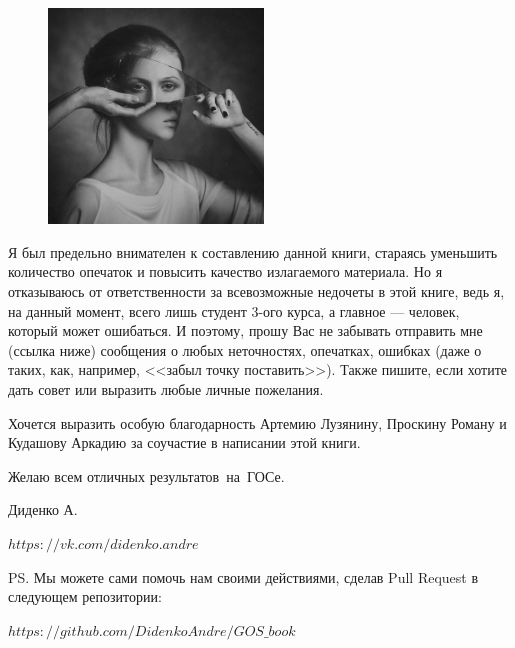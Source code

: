 \mbox{}

\begin{figure}
\vspace{-\baselineskip}
\includegraphics[width=0.51\textwidth]{pictures/love}
\end{figure}
Я был предельно внимателен к составлению данной книги, стараясь уменьшить количество опечаток и повысить качество излагаемого материала. Но я отказываюсь от ответственности за всевозможные недочеты в этой книге, ведь я, на данный момент, всего лишь студент 3-ого курса, а главное --- человек, который может ошибаться. И поэтому, прошу Вас не забывать отправить мне (ссылка ниже) сообщения о любых неточностях, опечатках, ошибках (даже о таких, как, например, <<забыл точку поставить>>). Также пишите, если хотите дать совет или выразить любые личные пожелания. 

Хочется выразить особую благодарность Артемию Лузянину, Проскину Роману и Кудашову Аркадию за соучастие в написании этой книги.
 
\vspace*{\baselineskip}

Желаю всем отличных результатов~на~ГОСе.

\mbox{}

\noindent Диденко А. 

\noindent\href{https://vk.com/didenko.andre}{$https://vk.com/didenko.andre$}

\mbox{}

\noindent PS. Мы можете сами помочь нам своими действиями, сделав Pull Request в следующем репозитории:

\noindent\href{https://github.com/DidenkoAndre/GOS_book}{$https://github.com/DidenkoAndre/GOS\_book$}